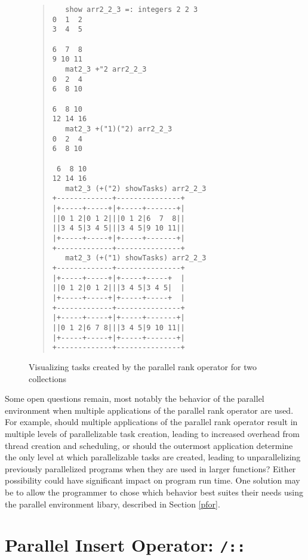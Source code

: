 \begin{figure}[p]
\begin{quote}
\begin{singlespacing}
\begin{small}
\begin{verbatim}
   show arr2_2_3 =: integers 2 2 3
0  1  2
3  4  5

6  7  8
9 10 11
   mat2_3 +"2 arr2_2_3
0  2  4
6  8 10

6  8 10
12 14 16
   mat2_3 +("1)("2) arr2_2_3
0  2  4
6  8 10

 6  8 10
12 14 16
   mat2_3 (+("2) showTasks) arr2_2_3
+-------------+---------------+
|+-----+-----+|+-----+-------+|
||0 1 2|0 1 2|||0 1 2|6  7  8||
||3 4 5|3 4 5|||3 4 5|9 10 11||
|+-----+-----+|+-----+-------+|
+-------------+---------------+
   mat2_3 (+("1) showTasks) arr2_2_3
+-------------+---------------+
|+-----+-----+|+-----+-----+  |
||0 1 2|0 1 2|||3 4 5|3 4 5|  |
|+-----+-----+|+-----+-----+  |
+-------------+---------------+
|+-----+-----+|+-----+-------+|
||0 1 2|6 7 8|||3 4 5|9 10 11||
|+-----+-----+|+-----+-------+|
+-------------+---------------+
\end{verbatim}
\end{small}
\end{singlespacing}
\end{quote}
\caption{Visualizing tasks created by the parallel rank operator for two collections}
\label{fig::pr_tasks2}
\end{figure}

Some open questions remain, most notably 
the behavior of the parallel environment when multiple applications of the parallel rank operator are used. 
For example, should multiple applications of the parallel rank operator result in multiple levels of parallelizable task creation, 
leading to increased overhead from thread creation and scheduling, 
or should the outermost application determine the only level at which parallelizable tasks are created, 
leading to unparallelizing previously parallelized programs when they are used in larger functions? 
Either possibility could have significant impact on program run time.
One solution may be to allow the programmer to chose which behavior best suites their needs 
using the parallel environment libary, described in Section \ref{pfor}.

\section{Parallel Insert Operator: \texttt{/::}}
\label{pins}
